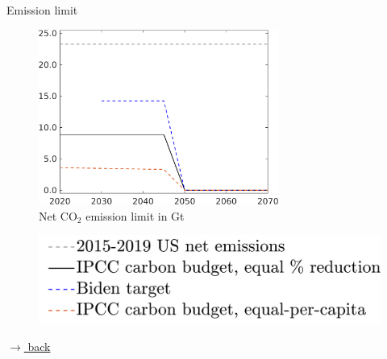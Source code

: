 \documentclass[11pt,aspectratio=169]{beamer}
\begin{document}
\begin{frame}{Emission limit}
	\begin{center}
		\begin{minipage}{0.6\textwidth}
			\begin{figure}
				\caption{Net CO$_2$ emission limit in Gt}
				\includegraphics[width=0.7\textwidth]{../codding_model/own_basedOnFried/optimalPol_010922_revision/figures/all_13Sept22_Tplus30/Emnet_goals_o1_lgd0.png}
			\end{figure}
		\end{minipage}
		\hspace{-10mm}
		\begin{minipage}{0.3\textwidth}
			\begin{figure}
				\includegraphics[width=1.4\textwidth]{../codding_model/own_basedOnFried/optimalPol_010922_revision/figures/all_13Sept22_Tplus30/Emnet_goals_o1_lgd1.png}
			\end{figure}
		\end{minipage}
	\end{center}
	
	\vspace{-6.5mm}
	\hfill \hyperlink{backparams}{\tiny{$\rightarrow$ back}}
\end{frame}
\end{document}
